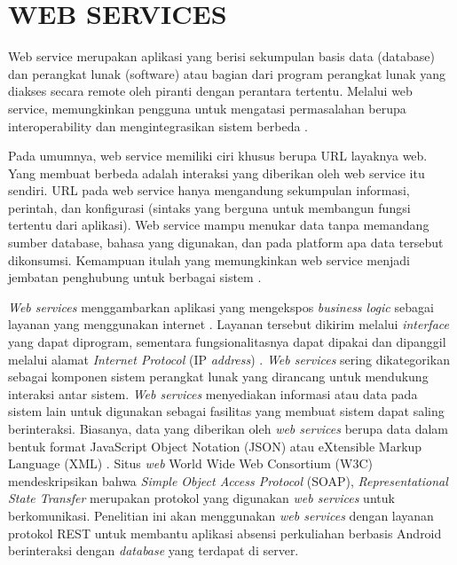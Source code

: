 \section{\uppercase{WEB SERVICES}}
\par Web service merupakan aplikasi yang berisi sekumpulan basis data (database) dan perangkat lunak (software) atau bagian dari program perangkat lunak yang diakses secara remote oleh piranti dengan perantara tertentu. Melalui web service, memungkinkan pengguna untuk mengatasi permasalahan berupa interoperability dan mengintegrasikan sistem berbeda \citep{Chuangwei2011}.

\par Pada umumnya, web service memiliki ciri khusus berupa URL layaknya web. Yang membuat berbeda adalah interaksi yang diberikan oleh web service itu sendiri. URL pada web service hanya mengandung sekumpulan informasi, perintah, dan konfigurasi (sintaks yang berguna untuk membangun fungsi tertentu dari aplikasi). Web service mampu menukar data tanpa memandang sumber database, bahasa yang digunakan, dan pada platform apa data tersebut dikonsumsi. Kemampuan itulah yang memungkinkan web service menjadi jembatan penghubung untuk berbagai sistem \citep{Chuangwei2011}.

\par \textit{Web services} menggambarkan aplikasi yang mengekspos \textit{business logic} sebagai layanan yang menggunakan internet \citep{Mironela2009}. Layanan tersebut dikirim melalui \textit{interface} yang dapat diprogram, sementara fungsionalitasnya dapat dipakai dan dipanggil melalui alamat \textit{Internet Protocol} (IP \textit{address}) \citep{Wagh2012}. \textit{Web services} sering dikategorikan sebagai komponen sistem perangkat lunak yang dirancang untuk mendukung interaksi antar sistem. \textit{Web services} menyediakan informasi atau data pada sistem lain untuk digunakan sebagai fasilitas yang membuat sistem dapat saling berinteraksi. Biasanya, data yang diberikan oleh \textit{web services} berupa data dalam bentuk format JavaScript Object Notation (JSON) atau eXtensible Markup Language (XML) \citep{Rahman2013}. Situs \textit{web} World Wide Web Consortium (W3C) mendeskripsikan  bahwa \textit{Simple Object Access Protocol} (SOAP), \textit{Representational State Transfer} merupakan protokol yang digunakan \textit{web services} untuk berkomunikasi. Penelitian ini akan menggunakan \textit{web services} dengan layanan protokol REST untuk membantu aplikasi absensi perkuliahan berbasis Android berinteraksi dengan \textit{database} yang terdapat di server.

